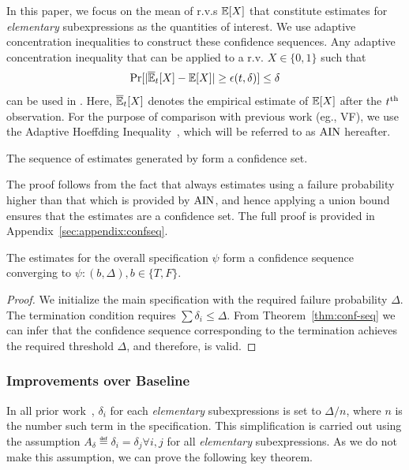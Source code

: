 In this paper, we focus on the mean of r.v.s $\mathbb{E}[X]$ that constitute estimates for \textit{elementary} subexpressions as the quantities of interest. 
We use adaptive concentration inequalities to construct these confidence sequences.
Any adaptive concentration inequality that can be applied to a r.v. $X \in \{0, 1\}$ such that 
\begin{equation}
    \Pr[|\overline{\mathbb{E}}_t[X] - \mathbb{E}[X]| \geq \epsilon(t, \delta)] \leq \delta
    \label{eq:adaptive-conc:general}
\end{equation}
can be used in \AVOIRmethodname{}. 
Here, $\overline{\mathbb{E}}_t[X]$ denotes the empirical estimate of $\mathbb{E}[X]$ after the $t^{\rm{th}}$ observation.
For the purpose of comparison with previous work (eg., VF), we use the Adaptive Hoeffding Inequality~\citep{zhao2016adaptive}, which will be referred to as $\rm{AIN}$ hereafter.

\begin{theorem}
The sequence of estimates generated by \AVOIRmethodname{} form a confidence set.
\label{thm:conf-seq}
\end{theorem}
The proof follows from the fact that \AVOIRmethodname{} always estimates using a failure probability higher than that which is provided by $\rm{AIN}$, and hence applying a union bound ensures that the estimates are a confidence set. 
The full proof is provided in Appendix~\ref{sec:appendix:confseq}.

\begin{corollary}
The estimates for the overall specification $\psi$ form a confidence sequence converging to $\psi: (b, \Delta), b \in \{T, F\}$.
\end{corollary}
\begin{proof}
We initialize the main specification with the required failure probability $\Delta$. 
The termination condition requires $\sum \delta_i \leq \Delta$.
From Theorem~\ref{thm:conf-seq} we can infer that the confidence sequence corresponding to the termination achieves the required threshold $\Delta$, and therefore, is valid.
\end{proof}


\subsubsection{Improvements over Baseline}
In all prior work~\citep{albarghouthi2017fairsquare,albarghouthi2019fairness,bastani2019probabilistic}, $\delta_i$ for each \textit{elementary} subexpressions is set to $\Delta/n$, where $n$ is the number such term in the specification.
This simplification is carried out using the assumption $A_\delta \eqdef \delta_i = \delta_j \forall i, j$ for all \textit{elementary} subexpressions.
As we do not make this assumption, we can prove the following key theorem.

